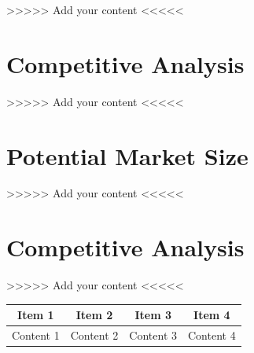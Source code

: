 \documentclass[11pt,fleqn]{book} %
\begin{document}
>>>>> Add your content <<<<<


\chapter{Competitive Analysis}

>>>>> Add your content <<<<<



\chapter{Potential Market Size}

>>>>> Add your content <<<<<



\chapter{Competitive Analysis}

>>>>> Add your content <<<<<\\

\begin{tabular}{|c|c|c|c|}
	\hline
	Item 1 & Item 2 & Item 3 & Item 4\\
    \hline
    Content 1 & Content 2 & Content 3 & Content 4\\
    \hline
\end{tabular}


\end{document}
